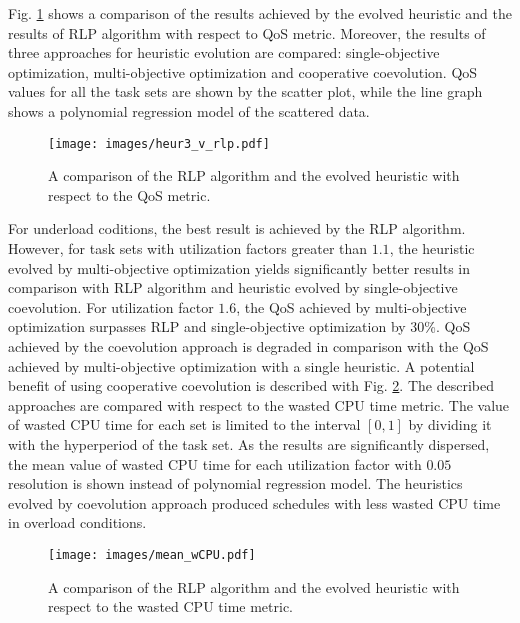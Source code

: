 Fig. \ref{heur_v_rlp} shows a comparison of the results achieved by the evolved heuristic and the results of RLP algorithm with respect to QoS metric.
Moreover, the results of three approaches for heuristic evolution are compared:
single-objective optimization, multi-objective optimization and cooperative coevolution.
QoS values for all the task sets are shown by the scatter plot, while the line graph shows a polynomial regression model of the scattered data.
\begin{figure}[ht]
    \centering
    \texttt{[image: images/heur3\_v\_rlp.pdf]}
    \caption{A comparison of the RLP algorithm and the evolved heuristic with respect to the QoS metric.}
    \label{heur_v_rlp}
\end{figure}
For underload coditions, the best result is achieved by the RLP algorithm.
However, for task sets with utilization factors greater than $1.1$, the heuristic evolved by multi-objective optimization yields significantly better results in comparison with RLP algorithm and heuristic evolved by single-objective coevolution.
For utilization factor $1.6$, the QoS achieved by multi-objective optimization surpasses RLP and single-objective optimization by 30\%.
QoS achieved by the coevolution approach is degraded in comparison with the QoS achieved by multi-objective optimization with a single heuristic.
A potential benefit of using cooperative coevolution is described with Fig. \ref{heur_v_rlp_wCPU}.
The described approaches are compared with respect to the wasted CPU time metric.
The value of wasted CPU time for each set is limited to the interval $[0, 1]$ by dividing it with the hyperperiod of the task set.
As the results are significantly dispersed, the mean value of wasted CPU time for each utilization factor with $0.05$ resolution is shown instead of polynomial regression model.
The heuristics evolved by coevolution approach produced schedules with less wasted CPU time in overload conditions.
\begin{figure}[ht]
    \centering
    \texttt{[image: images/mean\_wCPU.pdf]}
    \caption{A comparison of the RLP algorithm and the evolved heuristic with respect to the wasted CPU time metric.}
    \label{heur_v_rlp_wCPU}
\end{figure}


